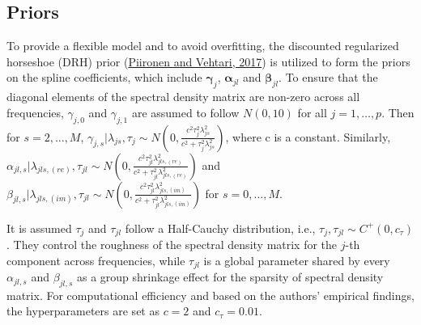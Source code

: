 \documentclass[12pt,a4paper]{article}
\begin{document}
\subsection{Priors}
To provide a flexible model and to avoid overfitting, the discounted regularized horseshoe (DRH) prior (\hyperref[pii2017]{Piironen and Vehtari, 2017}) is utilized to form the priors on the spline coefficients, which include $\bm{\gamma}_j$, $\bm{\alpha}_{jl}$ and $\bm{\beta}_{jl}$. To ensure that the diagonal elements of the spectral density matrix are non-zero across all frequencies, $\gamma_{j,0}$ and $\gamma_{j,1}$ are assumed to follow $N \left(0, 10\right)$ for all $j=1,\dots,p$. Then for $s=2,\dots,M$, $\gamma_{j,s}|\lambda_{js},\tau_j \sim N \left(0, \frac{c^2\tau_j^2\lambda_{js}^2}{c^2+\tau_j^2\lambda_{js}^2}\right)$, where c is a constant. Similarly, $\alpha_{jl,s}|\lambda_{jls,(re)},\tau_{jl} \sim N \left(0, \frac{c^2\tau_{jl}^2\lambda_{jls,(re)}^2}{c^2+\tau_{jl}^2\lambda_{jls,(re)}^2} \right)$ and $\beta_{jl,s}|\lambda_{jls,(im)},\tau_{jl} \sim N \left(0, \frac{c^2\tau_{jl}^2\lambda_{jls,(im)}^2}{c^2+\tau_{jl}^2\lambda_{jls,(im)}^2} \right)$ for $s=0,\dots,M$.

It is assumed $\tau_j$ and $\tau_{jl}$ follow a Half-Cauchy distribution, i.e., $\tau_j, \tau_{jl} \sim C^+(0,c_\tau)$. They control the roughness of the spectral density matrix for the $j$-th component across frequencies, while $\tau_{jl}$ is a global parameter shared by every $\alpha_{jl,s}$ and $\beta_{jl,s}$ as a group shrinkage effect for the sparsity of spectral density matrix. For computational efficiency and based on the authors' empirical findings, the hyperparameters are set as $c = 2$ and $c_\tau = 0.01$.
\end{document}
